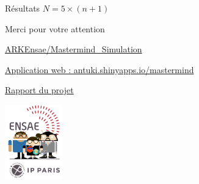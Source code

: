 \documentclass[10pt,xcolor=table,color={dvipsnames,usenames},ignorenonframetext,usepdftitle=false,french]{beamer}
\begin{document}
\begin{frame}{Résultats \(N=5\times (n+1)\)}
\normalsize

\end{frame}

\begin{frame}{Merci pour votre attention}
\protect\hypertarget{merci-pour-votre-attention}{}

\href{https://github.com/ARKEnsae/Mastermind_Simulation}{\faGithub{} ARKEnsae/Mastermind\_Simulation}

\href{https://antuki.shinyapps.io/mastermind}{\faChartBar{} Application web :  antuki.shinyapps.io/mastermind}

\href{https://arkensae.github.io/Mastermind_Simulation/Rapport/Rapport.html}{\faEdit{} Rapport du projet}

\begin{center}
\includegraphics[width = 2.5cm]{img/LOGO-ENSAE.png}
\end{center}

\end{frame}
\end{document}
